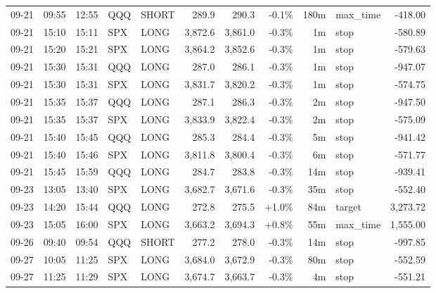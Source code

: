 \documentclass[11pt,a4paper,twoside]{article}
\begin{document}
\begin{center}
\begin{longtable}{>{\color{txtmain}}l l l l l r r r r >{\color{txtmain}}l r}
09-21 & 09:55 & 12:55 & QQQ & SHORT & 289.9 & 290.3 & \textcolor{lossred}{-0.1\%} & 180m & max\_time & \textcolor{lossred}{-418.00} \\
09-21 & 15:10 & 15:11 & SPX & LONG & 3,872.6 & 3,861.0 & \textcolor{lossred}{-0.3\%} & 1m & stop & \textcolor{lossred}{-580.89} \\
09-21 & 15:20 & 15:21 & SPX & LONG & 3,864.2 & 3,852.6 & \textcolor{lossred}{-0.3\%} & 1m & stop & \textcolor{lossred}{-579.63} \\
09-21 & 15:30 & 15:31 & QQQ & LONG & 287.0 & 286.1 & \textcolor{lossred}{-0.3\%} & 1m & stop & \textcolor{lossred}{-947.07} \\
09-21 & 15:30 & 15:31 & SPX & LONG & 3,831.7 & 3,820.2 & \textcolor{lossred}{-0.3\%} & 1m & stop & \textcolor{lossred}{-574.75} \\
09-21 & 15:35 & 15:37 & QQQ & LONG & 287.1 & 286.3 & \textcolor{lossred}{-0.3\%} & 2m & stop & \textcolor{lossred}{-947.50} \\
09-21 & 15:35 & 15:37 & SPX & LONG & 3,833.9 & 3,822.4 & \textcolor{lossred}{-0.3\%} & 2m & stop & \textcolor{lossred}{-575.09} \\
09-21 & 15:40 & 15:45 & QQQ & LONG & 285.3 & 284.4 & \textcolor{lossred}{-0.3\%} & 5m & stop & \textcolor{lossred}{-941.42} \\
09-21 & 15:40 & 15:46 & SPX & LONG & 3,811.8 & 3,800.4 & \textcolor{lossred}{-0.3\%} & 6m & stop & \textcolor{lossred}{-571.77} \\
09-21 & 15:45 & 15:59 & QQQ & LONG & 284.7 & 283.8 & \textcolor{lossred}{-0.3\%} & 14m & stop & \textcolor{lossred}{-939.41} \\
09-23 & 13:05 & 13:40 & SPX & LONG & 3,682.7 & 3,671.6 & \textcolor{lossred}{-0.3\%} & 35m & stop & \textcolor{lossred}{-552.40} \\
09-23 & 14:20 & 15:44 & QQQ & LONG & 272.8 & 275.5 & \textcolor{wingreen}{+1.0\%} & 84m & target & \textcolor{wingreen}{3,273.72} \\
09-23 & 15:05 & 16:00 & SPX & LONG & 3,663.2 & 3,694.3 & \textcolor{wingreen}{+0.8\%} & 55m & max\_time & \textcolor{wingreen}{1,555.00} \\
09-26 & 09:40 & 09:54 & QQQ & SHORT & 277.2 & 278.0 & \textcolor{lossred}{-0.3\%} & 14m & stop & \textcolor{lossred}{-997.85} \\
09-27 & 10:05 & 11:25 & SPX & LONG & 3,684.0 & 3,672.9 & \textcolor{lossred}{-0.3\%} & 80m & stop & \textcolor{lossred}{-552.59} \\
09-27 & 11:25 & 11:29 & SPX & LONG & 3,674.7 & 3,663.7 & \textcolor{lossred}{-0.3\%} & 4m & stop & \textcolor{lossred}{-551.21} \\

\end{longtable}
\end{center}
\end{document}
